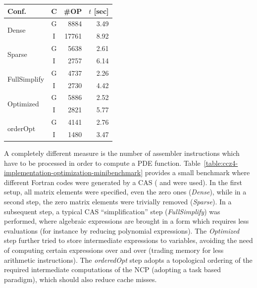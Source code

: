 \begin{margintable}[-6cm]
	\begin{tabular}{lcrr}
		\toprule
		Conf. & C & \#OP & $t$ [sec] \\
		\midrule
		\multirow{2}{*}{Dense}  & G & 8884 & 3.49 \\
		& I & 17761 & 8.92 \\
		\multirow{2}{*}{Sparse} & G & 5638 & 2.61  \\
		& I & 2757 & 6.14 \\
		\multirow{2}{*}{FullSimplify} & G & 4737 & 2.26  \\
		& I & 2730 & 4.42  \\
		\multirow{2}{*}{Optimized}  & G   & 5886 & 2.52  \\
		& I & 2821 & 5.77  \\
		\multirow{2}{*}{orderOpt} & G & 4141 & 2.76 \\
		& I & 1480 & 3.47 \\
		
		\bottomrule
	\end{tabular}
	\caption[
	Performance results of generating an optimized Z4 implementation
	]{
		\footnotesize %
		Measuring the impact of differently ``optimized'' generated code
		to compute the NCP of the Z4 system. The first column describes
		the experiment, the second column shows which compiler was used
		to compile the Fortran code to assembler (G=GNU compiler,
		I=Intel compiler), \#OP indicates the number of assembler
		instructions which were generated while $t$ shows the serial
		runtime for $6\cdot10^6$ evaluations of the NCP with arbitrary
		but same state vectors (pseudo-randomly generated with the same seed).
		\\
		Experiments and interpretation are given in the main text.
	}\label{table:ccz4-implementation-optimization-minibenchmark}
\end{margintable}
%
A completely different measure is the number of assembler instructions
which have to be processed in order to compute a PDE function.
Table~\ref{table:ccz4-implementation-optimization-minibenchmark} provides
a small benchmark where different Fortran codes were generated by a CAS
( and  were used). In the first setup, all matrix elements
were specified, even the zero ones (\emph{Dense}), while in a second step,
the zero matrix elements were trivially removed (\emph{Sparse}). In a
subsequent step, a typical CAS ``simplification'' step (\emph{FullSimplify}) 
was performed, where algebraic expressions are brought in a form which requires
less evaluations (for instance by reducing polynomial expressions). The
\emph{Optimized} step further tried to store intermediate expressions to
variables, avoiding the need of computing certain expressions over and over
(trading memory for less arithmetic instructions). The \emph{orderedOpt} step
adopts a topological ordering of the required intermediate computations of the NCP
(adopting a task based paradigm), which should also reduce cache misses.

